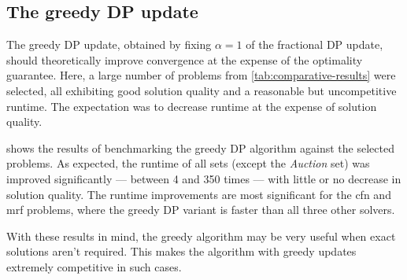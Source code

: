 \subsection{The greedy DP update}
The greedy DP update, obtained by fixing \(\alpha=1\) of the fractional DP update, should theoretically improve convergence at the expense of the optimality guarantee.
Here, a large number of problems from \cref{tab:comparative-results} were selected, all exhibiting good solution quality and a reasonable but uncompetitive runtime.
The expectation was to decrease runtime at the expense of solution quality.

 shows the results of benchmarking the greedy DP algorithm against the selected problems.
As expected, the runtime of all sets (except the \emph{Auction} set) was improved significantly --- between \num{4} and \num{350} times --- with little or no decrease in solution quality.
The runtime improvements are most significant for the \gls{cfn} and \gls{mrf} problems, where the greedy DP variant is faster than all three other solvers.



With these results in mind, the greedy algorithm may be very useful when exact solutions aren't required.
This makes the algorithm with greedy updates extremely competitive in such cases.




